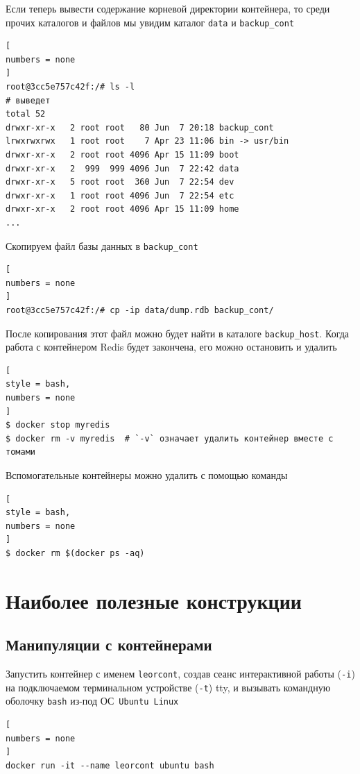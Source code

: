\documentclass[%
	11pt,
	a4paper,
	utf8,
		]{article}
\begin{document}
Если теперь вывести содержание корневой директории контейнера, то среди прочих каталогов и файлов мы увидим каталог \texttt{data} и \texttt{backup\_cont}
\begin{lstlisting}[
numbers = none
]
root@3cc5e757c42f:/# ls -l
# выведет
total 52
drwxr-xr-x   2 root root   80 Jun  7 20:18 backup_cont
lrwxrwxrwx   1 root root    7 Apr 23 11:06 bin -> usr/bin
drwxr-xr-x   2 root root 4096 Apr 15 11:09 boot
drwxr-xr-x   2  999  999 4096 Jun  7 22:42 data
drwxr-xr-x   5 root root  360 Jun  7 22:54 dev
drwxr-xr-x   1 root root 4096 Jun  7 22:54 etc
drwxr-xr-x   2 root root 4096 Apr 15 11:09 home
...
\end{lstlisting}

Скопируем файл базы данных в \texttt{backup\_cont}
\begin{lstlisting}[
numbers = none
]
root@3cc5e757c42f:/# cp -ip data/dump.rdb backup_cont/
\end{lstlisting}

После копирования этот файл можно будет найти в каталоге \texttt{backup\_host}. Когда работа с контейнером Redis будет закончена, его можно остановить и удалить
\begin{lstlisting}[
style = bash,
numbers = none
]
$ docker stop myredis
$ docker rm -v myredis  # `-v` означает удалить контейнер вместе с томами
\end{lstlisting}

Вспомогательные контейнеры можно удалить с помощью команды
\begin{lstlisting}[
style = bash,
numbers = none
]
$ docker rm $(docker ps -aq)
\end{lstlisting}


\section{Наиболее полезные конструкции}

\subsection{Манипуляции с контейнерами}

Запустить контейнер с именем \texttt{leorcont}, создав сеанс интерактивной работы (\texttt{-i}) на подключаемом терминальном устройстве (\texttt{-t}) tty, и вызывать командную оболочку \texttt{bash} из-под ОС~\texttt{Ubuntu Linux}

\begin{lstlisting}[
numbers = none
]
docker run -it --name leorcont ubuntu bash
\end{lstlisting}
\end{document}
